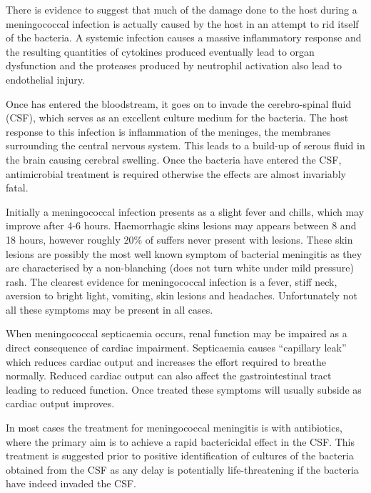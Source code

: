 There is evidence to suggest that much of the damage done to the host during a meningococcal infection is actually caused by the host in an attempt to rid itself of the bacteria\cite{Pathan2003}. A systemic infection causes a massive inflammatory response and the resulting quantities of cytokines produced eventually lead to organ dysfunction and the proteases produced by neutrophil activation also lead to endothelial injury\cite{Pathan2003}.

Once \Nm{} has entered the bloodstream, it goes on to invade the cerebro-spinal fluid (CSF), which serves as an excellent culture medium for the bacteria\cite{DeVoe1982}. The host response to this infection is inflammation of the meninges, the membranes surrounding the central nervous system. This leads to a build-up of serous fluid in the brain causing cerebral swelling. Once the bacteria have entered the CSF, antimicrobial treatment is required otherwise the effects are almost invariably fatal\cite{DeVoe1982}.

Initially a meningococcal infection presents as a slight fever and chills, which may improve after 4-6 hours. Haemorrhagic skins lesions may appears between 8 and 18 hours, however roughly 20\% of suffers never present with lesions. These skin lesions are possibly the most well known symptom of bacterial meningitis as they are characterised by a non-blanching (does not turn white under mild pressure) rash. The clearest evidence for meningococcal infection is a fever, stiff neck, aversion to bright light, vomiting, skin lesions and headaches. Unfortunately not all these symptoms may be present in all cases\cite{DeVoe1982}.

When meningococcal septicaemia occurs, renal function may be impaired as a direct consequence of cardiac impairment. Septicaemia causes ``capillary leak'' which reduces cardiac output and increases the effort required to breathe normally. Reduced cardiac output can also affect the gastrointestinal tract leading to reduced function. Once treated these symptoms will usually subside as cardiac output improves\cite{Pathan2003}.

In most cases the treatment for meningococcal meningitis is with antibiotics, where the primary aim is to achieve a rapid bactericidal effect in the CSF\cite{Deuren2000}. This treatment is suggested prior to positive identification of cultures of the bacteria obtained from the CSF as any delay is potentially life-threatening if the bacteria have indeed invaded the CSF\cite{DeVoe1982}.

